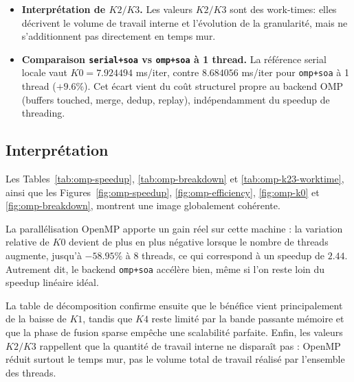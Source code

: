 \begin{itemize}[leftmargin=*]
  \item \textbf{Interprétation de \(K2/K3\).}
  Les valeurs \(K2/K3\) sont des work-times: elles décrivent le volume de travail interne et
  l'évolution de la granularité, mais ne s'additionnent pas directement en temps mur.
\end{itemize}

\begin{itemize}[leftmargin=*]
  \item \textbf{Comparaison \texttt{serial+soa} vs \texttt{omp+soa} à 1 thread.}
  La référence serial locale vaut \(K0=7.924494\) ms/iter, contre \(8.684056\) ms/iter pour
  \texttt{omp+soa} à 1 thread (\(+9.6\%\)). Cet écart vient du coût structurel propre au backend
  OMP (buffers touched, merge, dedup, replay), indépendamment du speedup de threading.
\end{itemize}

\subsection{Interprétation}

Les Tables~\ref{tab:omp-speedup}, \ref{tab:omp-breakdown} et \ref{tab:omp-k23-worktime},
ainsi que les Figures~\ref{fig:omp-speedup}, \ref{fig:omp-efficiency}, \ref{fig:omp-k0}
et \ref{fig:omp-breakdown},
montrent une image globalement cohérente.

La parallélisation OpenMP apporte un gain réel sur cette machine :
la variation relative de \(K0\) devient de plus en plus négative lorsque le nombre de threads
augmente, jusqu'à \(-58.95\%\) à 8 threads, ce qui correspond à un speedup de \(2.44\).
Autrement dit, le backend \texttt{omp+soa} accélère bien, même si l'on reste loin du speedup
linéaire idéal.

La table de décomposition confirme ensuite que le bénéfice vient principalement de la baisse de
\(K1\), tandis que \(K4\) reste limité par la bande passante mémoire et que la phase de fusion
sparse empêche une scalabilité parfaite. Enfin, les valeurs \(K2/K3\) rappellent que la quantité
de travail interne ne disparaît pas : OpenMP réduit surtout le temps mur, pas le volume total de
travail réalisé par l'ensemble des threads.
